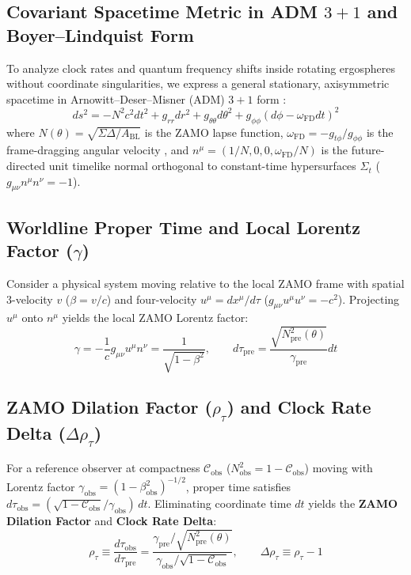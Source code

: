 \documentclass[11pt,a4paper]{article}
\begin{document}
\subsection{Covariant Spacetime Metric in ADM $3+1$ and Boyer--Lindquist Form}
To analyze clock rates and quantum frequency shifts inside rotating ergospheres without coordinate singularities, we express a general stationary, axisymmetric spacetime in Arnowitt--Deser--Misner (ADM) $3+1$ form \cite{ADM1962,MTW1973}:
\begin{equation}
ds^2 = -N^2 c^2 dt^2 + g_{rr} dr^2 + g_{\theta\theta} d\theta^2 + g_{\phi\phi} (d\phi - \omega_{\text{FD}} dt)^2
\end{equation}
where $N(\theta) = \sqrt{\Sigma \Delta / A_{\text{BL}}}$ is the ZAMO lapse function, $\omega_{\text{FD}} = -g_{t\phi} / g_{\phi\phi}$ is the frame-dragging angular velocity \cite{BPT1972}, and $n^\mu = (1/N, 0, 0, \omega_{\text{FD}}/N)$ is the future-directed unit timelike normal orthogonal to constant-time hypersurfaces $\Sigma_t$ ($g_{\mu\nu} n^\mu n^\nu = -1$).

\subsection{Worldline Proper Time and Local Lorentz Factor ($\gamma$)}
Consider a physical system moving relative to the local ZAMO frame with spatial 3-velocity $v$ ($\beta = v/c$) and four-velocity $u^\mu = dx^\mu / d\tau$ ($g_{\mu\nu} u^\mu u^\nu = -c^2$). Projecting $u^\mu$ onto $n^\mu$ yields the local ZAMO Lorentz factor:
\begin{equation}
\gamma = -\frac{1}{c} g_{\mu\nu} u^\mu n^\nu = \frac{1}{\sqrt{1 - \beta^2}}, \qquad d\tau_{\text{pre}} = \frac{\sqrt{N^2_{\text{pre}}(\theta)}}{\gamma_{\text{pre}}} dt
\end{equation}

\subsection{ZAMO Dilation Factor ($\rho_\tau$) and Clock Rate Delta ($\Delta\rho_\tau$)}
For a reference observer at compactness $\mathcal{C}_{\text{obs}}$ ($N^2_{\text{obs}} = 1 - \mathcal{C}_{\text{obs}}$) moving with Lorentz factor $\gamma_{\text{obs}} = (1 - \beta_{\text{obs}}^2)^{-1/2}$, proper time satisfies $d\tau_{\text{obs}} = (\sqrt{1 - \mathcal{C}_{\text{obs}}} / \gamma_{\text{obs}})\,dt$. Eliminating coordinate time $dt$ yields the \textbf{ZAMO Dilation Factor} and \textbf{Clock Rate Delta}:
\begin{equation}
\rho_\tau \equiv \frac{d\tau_{\text{obs}}}{d\tau_{\text{pre}}} = \frac{\gamma_{\text{pre}} / \sqrt{N^2_{\text{pre}}(\theta)}}{\gamma_{\text{obs}} / \sqrt{1 - \mathcal{C}_{\text{obs}}}}, \qquad \Delta\rho_\tau \equiv \rho_\tau - 1
\end{equation}
\end{document}
